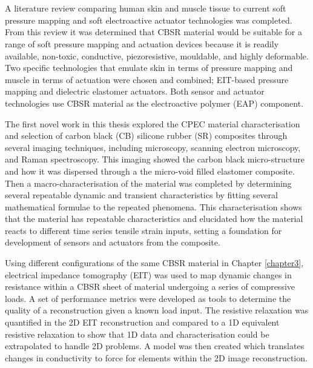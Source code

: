 \chapter{\chapviiiname}
\label{chapter8}
A literature review comparing human skin and muscle tissue to current soft pressure mapping and soft electroactive actuator technologies was completed. From this review it was determined that CBSR material would be suitable for a range of soft pressure mapping and actuation devices because it is readily available, non-toxic, conductive, piezoresistive, mouldable, and highly deformable. Two specific technologies that emulate skin in terms of pressure mapping and muscle in terms of actuation were chosen and combined; EIT-based pressure mapping and dielectric elastomer actuators. Both sensor and actuator technologies use CBSR material as the electroactive polymer (EAP) component.

The first novel work in this thesis explored the CPEC material characterisation and selection of carbon black (CB) silicone rubber (SR) composites through several imaging techniques, including microscopy, scanning electron microscopy, and Raman spectroscopy. This imaging showed the carbon black micro-structure and how it was dispersed through a the micro-void filled elastomer composite. Then a macro-characterisation of the material was completed by determining several repeatable dynamic and transient characteristics by fitting several mathematical formulae to the repeated phenomena. This characterisation shows that the material has repeatable characteristics and elucidated how the material reacts to different time series tensile strain inputs, setting a foundation for development of sensors and actuators from the composite.

Using different configurations of the same CBSR material in Chapter \ref{chapter3}, electrical impedance tomography (EIT) was used to map dynamic changes in resistance within a CBSR sheet of material undergoing a series of compressive loads. A set of performance metrics were developed as tools to determine the quality of a reconstruction given a known load input. The resistive relaxation was quantified in the 2D EIT reconstruction and compared to a 1D equivalent resistive relaxation to show that 1D data and characterisation could be extrapolated to handle 2D problems. A model was then created which translates changes in conductivity to force for elements within the 2D image reconstruction. 

